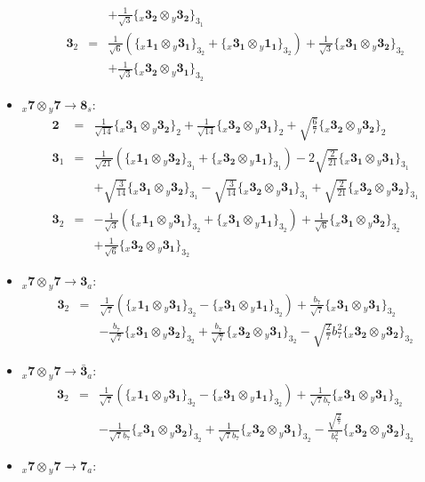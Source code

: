 \documentclass[english]{article}
\newcommand{\rep}[1]{\mathbf{#1}}
\newcommand{\repx}[2]{{}_{#2}\mathbf{#1}}
\newcommand{\subcg}[3]{\big\{ \repx{#1}{x}\otimes\repx{#2}{y}\big\}^{}_{#3}}
\begin{document}
\begin{itemize}
\begin{eqnarray*}
 & & +\frac{1}{\sqrt{3}}\subcg{3_{2}}{3_{2}}{3_{1}}
\\
\rep{3}_{2} &=& \frac{1}{\sqrt{6}}\left(\subcg{1_{1}}{3_{1}}{3_{2}}+\subcg{3_{1}}{1_{1}}{3_{2}}\right)+\frac{1}{\sqrt{3}}\subcg{3_{1}}{3_{2}}{3_{2}} \\ 
 & & +\frac{1}{\sqrt{3}}\subcg{3_{2}}{3_{1}}{3_{2}}
\end{eqnarray*}
\item $\repx{7}{x}\otimes\repx{7}{y}\to\rep{8}_{s}$:
\begin{eqnarray*}
\rep{2} &=& \frac{1}{\sqrt{14}}\subcg{3_{1}}{3_{2}}{2}+\frac{1}{\sqrt{14}}\subcg{3_{2}}{3_{1}}{2}+\sqrt{\frac{6}{7}}\subcg{3_{2}}{3_{2}}{2}
\\
\rep{3}_{1} &=& \frac{1}{\sqrt{21}}\left(\subcg{1_{1}}{3_{2}}{3_{1}}+\subcg{3_{2}}{1_{1}}{3_{1}}\right)-2 \sqrt{\frac{2}{21}}\subcg{3_{1}}{3_{1}}{3_{1}} \\ 
 & & +\sqrt{\frac{3}{14}}\subcg{3_{1}}{3_{2}}{3_{1}}-\sqrt{\frac{3}{14}}\subcg{3_{2}}{3_{1}}{3_{1}}+\sqrt{\frac{2}{21}}\subcg{3_{2}}{3_{2}}{3_{1}}
\\
\rep{3}_{2} &=& -\frac{1}{\sqrt{3}}\left(\subcg{1_{1}}{3_{1}}{3_{2}}+\subcg{3_{1}}{1_{1}}{3_{2}}\right)+\frac{1}{\sqrt{6}}\subcg{3_{1}}{3_{2}}{3_{2}} \\ 
 & & +\frac{1}{\sqrt{6}}\subcg{3_{2}}{3_{1}}{3_{2}}
\end{eqnarray*}
\item $\repx{7}{x}\otimes\repx{7}{y}\to\rep{3}_{a}$:
\begin{eqnarray*}
\rep{3}_{2} &=& \frac{1}{\sqrt{7}}\left(\subcg{1_{1}}{3_{1}}{3_{2}}-\subcg{3_{1}}{1_{1}}{3_{2}}\right)+\frac{b_7}{\sqrt{7}}\subcg{3_{1}}{3_{1}}{3_{2}} \\ 
 & & -\frac{b_7}{\sqrt{7}}\subcg{3_{1}}{3_{2}}{3_{2}}+\frac{b_7}{\sqrt{7}}\subcg{3_{2}}{3_{1}}{3_{2}}-\sqrt{\frac{2}{7}} b_7^2\subcg{3_{2}}{3_{2}}{3_{2}}
\end{eqnarray*}
\item $\repx{7}{x}\otimes\repx{7}{y}\to\rep{\bar{3}}_{a}$:
\begin{eqnarray*}
\rep{3}_{2} &=& \frac{1}{\sqrt{7}}\left(\subcg{1_{1}}{3_{1}}{3_{2}}-\subcg{3_{1}}{1_{1}}{3_{2}}\right)+\frac{1}{\sqrt{7} b_7}\subcg{3_{1}}{3_{1}}{3_{2}} \\ 
 & & -\frac{1}{\sqrt{7} b_7}\subcg{3_{1}}{3_{2}}{3_{2}}+\frac{1}{\sqrt{7} b_7}\subcg{3_{2}}{3_{1}}{3_{2}}-\frac{\sqrt{\frac{2}{7}}}{b_7^2}\subcg{3_{2}}{3_{2}}{3_{2}}
\end{eqnarray*}
\item $\repx{7}{x}\otimes\repx{7}{y}\to\rep{7}_{a}$:

\end{itemize}
\end{document}
